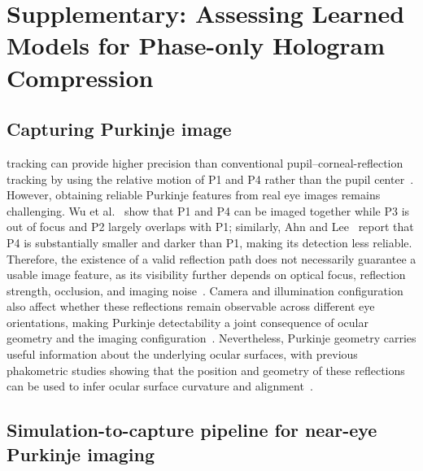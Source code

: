 \documentclass[sigconf,screen,review]{acmart}
\begin{document}
\section*{Supplementary: Assessing Learned Models for Phase-only Hologram Compression}

\subsection{Capturing Purkinje image}
\DPI{} tracking can provide higher precision than conventional pupil--corneal-reflection tracking by using the relative motion of P1 and P4 rather than the pupil center~\cite{OpenIrisDPI,Dual_Purkinje_Tracker}.
However, obtaining reliable Purkinje features from real eye images remains challenging. Wu et al.~ show that P1 and P4 can be imaged together while P3 is out of focus and P2 largely overlaps with P1; similarly, Ahn and Lee~ report that P4 is substantially smaller and darker than P1, making its detection less reliable.
Therefore, the existence of a valid reflection path does not necessarily guarantee a usable image feature, as its visibility further depends on optical focus, reflection strength, occlusion, and imaging noise~\cite{Dual_Purkinje_Tracker,Depth_fixation_DPI}.
Camera and illumination configuration also affect whether these reflections remain observable across different eye orientations, making Purkinje detectability a joint consequence of ocular geometry and the imaging configuration~\cite{Dual_Purkinje_Tracker,Improved_vergence_and_accommodation}.
Nevertheless, Purkinje geometry carries useful information about the underlying ocular surfaces, with previous phakometric studies showing that the position and geometry of these reflections can be used to infer ocular surface curvature and alignment~\cite{Purkinje_Surface_Measurement}.

\subsection{Simulation-to-capture pipeline for near-eye Purkinje imaging}
\end{document}
